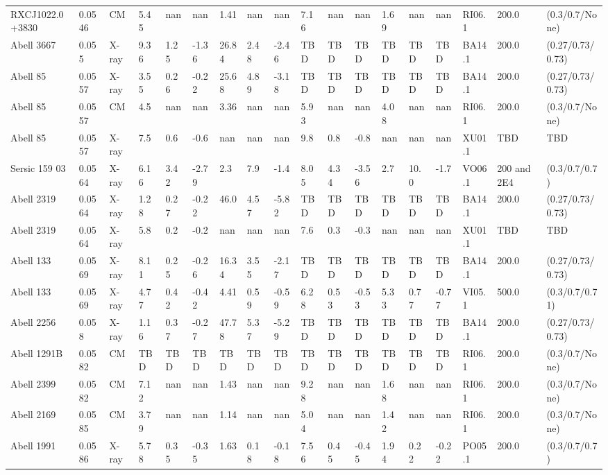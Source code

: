 \documentclass{article}
\begin{document}
\begin{center}
\begin{landscape}
\begin{longtable}{llllllllllllllllll}
RXCJ1022.0+3830 & 0.0546 & CM & 5.45 & nan & nan & 1.41 & nan & nan & 7.16 & nan & nan & 1.69 & nan & nan & RI06.1 & 200.0 & (0.3/0.7/None) \\
Abell 3667 & 0.055 & X-ray & 9.36 & 1.25 & -1.36 & 26.84 & 2.48 & -2.46 & TBD & TBD & TBD & TBD & TBD & TBD & BA14.1 & 200.0 & (0.27/0.73/0.73) \\
Abell 85 & 0.0557 & X-ray & 3.55 & 0.26 & -0.22 & 25.68 & 4.89 & -3.18 & TBD & TBD & TBD & TBD & TBD & TBD & BA14.1 & 200.0 & (0.27/0.73/0.73) \\
Abell 85 & 0.0557 & CM & 4.5 & nan & nan & 3.36 & nan & nan & 5.93 & nan & nan & 4.08 & nan & nan & RI06.1 & 200.0 & (0.3/0.7/None) \\
Abell 85 & 0.0557 & X-ray & 7.5 & 0.6 & -0.6 & nan & nan & nan & 9.8 & 0.8 & -0.8 & nan & nan & nan & XU01.1 & TBD & TBD \\
Sersic 159 03 & 0.0564 & X-ray & 6.16 & 3.42 & -2.79 & 2.3 & 7.9 & -1.4 & 8.05 & 4.34 & -3.56 & 2.7 & 10.0 & -1.7 & VO06.1 & 200 and 2E4 & (0.3/0.7/0.7) \\
Abell 2319 & 0.0564 & X-ray & 1.28 & 0.27 & -0.22 & 46.0 & 4.57 & -5.82 & TBD & TBD & TBD & TBD & TBD & TBD & BA14.1 & 200.0 & (0.27/0.73/0.73) \\
Abell 2319 & 0.0564 & X-ray & 5.8 & 0.2 & -0.2 & nan & nan & nan & 7.6 & 0.3 & -0.3 & nan & nan & nan & XU01.1 & TBD & TBD \\
Abell 133 & 0.0569 & X-ray & 8.11 & 0.25 & -0.26 & 16.34 & 3.55 & -2.17 & TBD & TBD & TBD & TBD & TBD & TBD & BA14.1 & 200.0 & (0.27/0.73/0.73) \\
Abell 133 & 0.0569 & X-ray & 4.77 & 0.42 & -0.42 & 4.41 & 0.59 & -0.59 & 6.28 & 0.53 & -0.53 & 5.33 & 0.77 & -0.77 & VI05.1 & 500.0 & (0.3/0.7/0.71) \\
Abell 2256 & 0.058 & X-ray & 1.16 & 0.37 & -0.27 & 47.78 & 5.37 & -5.29 & TBD & TBD & TBD & TBD & TBD & TBD & BA14.1 & 200.0 & (0.27/0.73/0.73) \\
Abell 1291B & 0.0582 & CM & TBD & TBD & TBD & TBD & TBD & TBD & TBD & TBD & TBD & TBD & TBD & TBD & RI06.1 & 200.0 & (0.3/0.7/None) \\
Abell 2399 & 0.0582 & CM & 7.12 & nan & nan & 1.43 & nan & nan & 9.28 & nan & nan & 1.68 & nan & nan & RI06.1 & 200.0 & (0.3/0.7/None) \\
Abell 2169 & 0.0585 & CM & 3.79 & nan & nan & 1.14 & nan & nan & 5.04 & nan & nan & 1.42 & nan & nan & RI06.1 & 200.0 & (0.3/0.7/None) \\
Abell 1991 & 0.0586 & X-ray & 5.78 & 0.35 & -0.35 & 1.63 & 0.18 & -0.18 & 7.56 & 0.45 & -0.45 & 1.94 & 0.22 & -0.22 & PO05.1 & 200.0 & (0.3/0.7/0.7) \\

\end{longtable}
\end{landscape}
\end{center}
\end{document}
